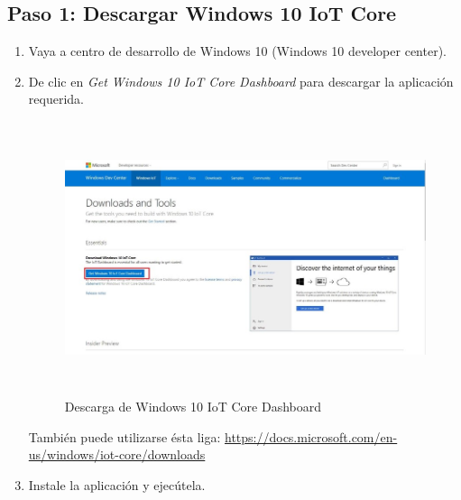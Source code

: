 \documentclass[letterpaper,10.5pt]{article}
\begin{document}
%
%
\subsection{Paso 1: Descargar Windows 10 IoT Core}%
\label{sec:step1}

\begin{enumerate}
	\item Vaya a centro de desarrollo de Windows 10 (Windows 10 developer center).
	\item De clic en \textit{Get Windows 10 IoT Core Dashboard} para descargar la aplicación requerida.
	\begin{figure}[H]
		\centering%
		\includegraphics[width=0.5\columnwidth,height=8cm,keepaspectratio]{img/p02-01.jpg} %
		\caption{Descarga de Windows 10 IoT Core Dashboard}
		\label{fig:dashboard-download} %
	\end{figure}
	También puede utilizarse ésta liga:
	\url{https://docs.microsoft.com/en-us/windows/iot-core/downloads}

	\item Instale la aplicación y ejecútela.


\end{enumerate}
\end{document}
